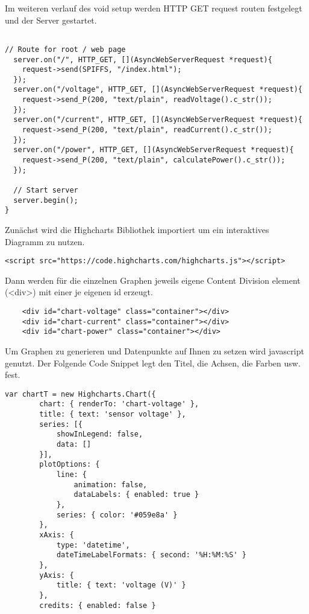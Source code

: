 \documentclass[ngerman]{mucproc}
\newenvironment{minted}[2][]{\endgraf\verbatim}{\endverbatim}
\begin{document}
Im weiteren verlauf des void setup werden HTTP GET request routen festgelegt und der Server gestartet.

\begin{verbatim}

// Route for root / web page
  server.on("/", HTTP_GET, [](AsyncWebServerRequest *request){
    request->send(SPIFFS, "/index.html");
  });
  server.on("/voltage", HTTP_GET, [](AsyncWebServerRequest *request){
    request->send_P(200, "text/plain", readVoltage().c_str());
  });
  server.on("/current", HTTP_GET, [](AsyncWebServerRequest *request){
    request->send_P(200, "text/plain", readCurrent().c_str());
  });
  server.on("/power", HTTP_GET, [](AsyncWebServerRequest *request){
    request->send_P(200, "text/plain", calculatePower().c_str());
  });

  // Start server
  server.begin();
}
\end{verbatim}

Zunächst wird die Highcharts Bibliothek importiert \parencite{Highcharts.2021} um ein interaktives Diagramm zu nutzen.

\begin{verbatim}
<script src="https://code.highcharts.com/highcharts.js"></script>
\end{verbatim}

Dann werden für die einzelnen Graphen jeweils eigene Content Division element (<div>) mit einer je eigenen id erzeugt.

\begin{verbatim}
	<div id="chart-voltage" class="container"></div>
    <div id="chart-current" class="container"></div>
    <div id="chart-power" class="container"></div>
\end{verbatim}

Um Graphen zu generieren und Datenpunkte auf Ihnen zu setzen wird javascript genutzt. Der Folgende Code Snippet legt den Titel, die Achsen, die Farben usw. fest.

\begin{verbatim}
var chartT = new Highcharts.Chart({
        chart: { renderTo: 'chart-voltage' },
        title: { text: 'sensor voltage' },
        series: [{
            showInLegend: false,
            data: []
        }],
        plotOptions: {
            line: {
                animation: false,
                dataLabels: { enabled: true }
            },
            series: { color: '#059e8a' }
        },
        xAxis: {
            type: 'datetime',
            dateTimeLabelFormats: { second: '%H:%M:%S' }
        },
        yAxis: {
            title: { text: 'voltage (V)' }
        },
        credits: { enabled: false }
\end{verbatim}
\end{document}

